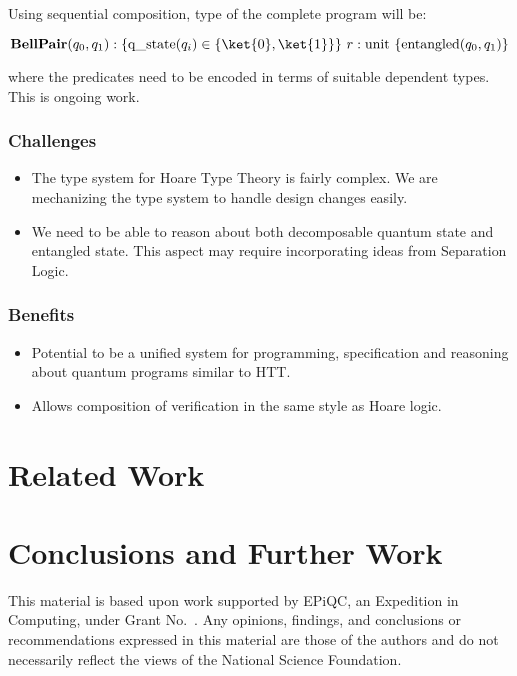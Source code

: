 \documentclass[acmsmall,nonacm]{acmart}\settopmatter{printfolios=true,printccs=false,printacmref=false}
\begin{document}
Using sequential composition, type of the complete program will be:

\[ \mathbf{BellPair}(q_0, q_1) : \{ \mathrm{q\_state}(q_i) \in \{\ket{0}, \ket{1} \}\}\ r : \mathrm{unit}\ \{ \mathrm{entangled}(q_0, q_1) \} \]

where the predicates need to be encoded in terms of suitable dependent types. This is ongoing work.

\subsubsection{Challenges}
\begin{itemize}
	\item The type system for Hoare Type Theory is fairly complex. We are mechanizing the type system to handle design changes easily.
	\item We need to be able to reason about both decomposable quantum state and entangled state. This aspect may require incorporating ideas from Separation Logic.
\end{itemize}

\subsubsection{Benefits}
\begin{itemize}
	\item Potential to be a unified system for programming, specification and reasoning about quantum programs similar to HTT.
	\item Allows composition of verification in the same style as Hoare logic.
\end{itemize}

\section{Related Work}


\section{Conclusions and Further Work}


\begin{acks}                            %
  This material is based upon work supported by
  EPiQC, an 
  Expedition in Computing, under Grant
  No.~.  Any opinions, findings, and
  conclusions or recommendations expressed in this material are those
  of the authors and do not necessarily reflect the views of the
  National Science Foundation.
\end{acks}




\end{document}
